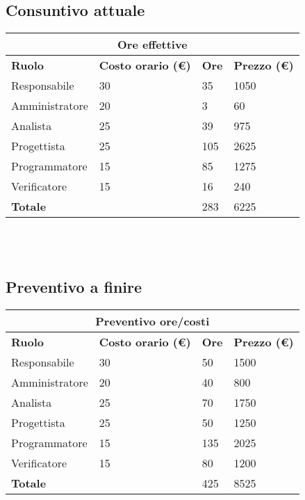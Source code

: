 \documentclass[a4paper, 12pt]{article}
\begin{document}
\subsection{Consuntivo attuale}
\begin{center}
    \begin{tabularx}{\textwidth}{|X|X|X|X|}
        \hline
        \multicolumn{4}{|c|}{\textbf{Ore effettive}}\\
        \hline
        \hline
        \textbf{Ruolo} & \textbf{Costo orario (\euro)} & \textbf{Ore} & \textbf{Prezzo (\euro)}\\
        \hline
        Responsabile    & 30 & 35 & 1050\\
        \hline
        Amministratore  & 20 & 3  & 60\\
        \hline
        Analista        & 25 & 39 & 975\\
        \hline
        Progettista     & 25 & 105  & 2625\\
        \hline
        Programmatore   & 15 & 85 & 1275\\
        \hline
        Verificatore    & 15 & 16 & 240\\
        \hline
        \hline
        \textbf{Totale} &    & 283 & 6225\\
        \hline
    \end{tabularx}\\[8pt]
    \mbox{}\\
\end{center}

\subsection{Preventivo a finire}
\begin{center}
    \begin{tabularx}{\textwidth}{|X|X|X|X|}
        \hline
        \multicolumn{4}{|c|}{\textbf{Preventivo ore/costi}}\\
        \hline
        \hline
        \textbf{Ruolo} & \textbf{Costo orario (\euro)} & \textbf{Ore} & \textbf{Prezzo (\euro)}\\
        \hline
        Responsabile    & 30 & 50  & 1500\\
        \hline
        Amministratore  & 20 & 40  & 800\\
        \hline
        Analista        & 25 & 70  & 1750\\
        \hline
        Progettista     & 25 & 50  & 1250\\
        \hline
        Programmatore   & 15 & 135  & 2025\\
        \hline
        Verificatore    & 15 & 80  & 1200\\
        \hline
        \hline
        \textbf{Totale} &    & 425 & 8525\\
        \hline
    \end{tabularx}\\[8pt]
    \mbox{}\\
\end{center}
\end{document}
